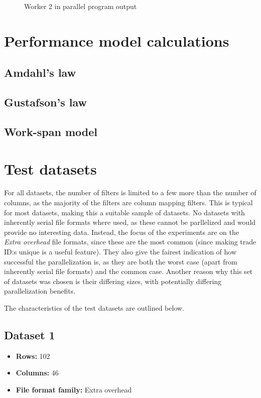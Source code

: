 \begin{figure}[ht]
  
  \caption{Worker 2 in parallel program  output}
  \label{fig:parallel_profiler_w2}
\end{figure}
\clearpage

\section{Performance model calculations}

\subsection{Amdahl's law}

\subsection{Gustafson's law}

\subsection{Work-span model}


\section{Test datasets}
For all datasets, the number of filters is limited to a few more than the number of columns, as the majority of the filters are column mapping filters.
This is typical for most datasets, making this a suitable sample of datasets. No datasets with inherently serial file formats where used, as these cannot be
parllelized and would provide no interesting data. Instead, the focus of the experiments are on the \textit{Extra overhead} file formats, since these are the
most common (since making trade ID:s unique is a useful feature). They also give the fairest indication of how successful the parallelization is, as they are
both the worst case (apart from inherently serial file formats) and the common case. Another reason why this set of datasets was chosen is their differing sizes,
with potentially differing parallelization benefits.

The characteristics of the test datasets are outlined below.

\subsection{Dataset 1}
\begin{itemize}
  \item \textbf{Rows:} 102
  \item \textbf{Columns:} 46
  \item \textbf{File format family:} Extra overhead
\end{itemize}

